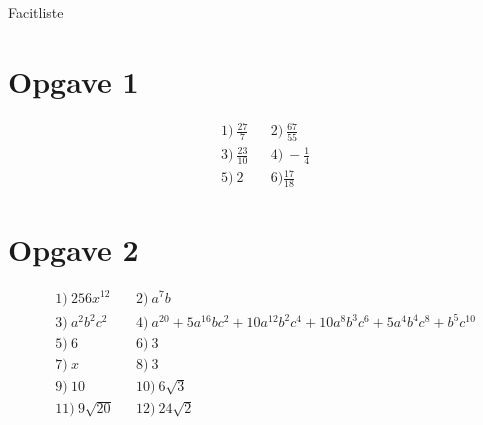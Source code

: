 \begin{center}
\Huge
Facitliste
\end{center}
\section*{Opgave 1}
\begin{align*}
&1) \ \frac{27}{7}  &&2)\ \frac{67}{55} \\
&3) \ \frac{23}{10}  &&4)\ -\frac{1}{4} \\
&5) \ 2  &&6) \frac{17}{18}\ 
\end{align*}
\section*{Opgave 2}
\begin{align*}
&1) \ 256x^{12}  &&2) \ a^7b \\
&3) \ a^2b^2c^2 &&4)  \ a^{20} + 5 a^{16} b c^2 + 10 a^{12} b^2 c^4 + 10 a^8 b^3 c^6 + 5 a^4 b^4 c^8 + b^5 c^{10} \\
&5) \ 6  &&6) \ 3 \\
&7) \ x  &&8) \ 3 \\
&9) \ 10 &&10) \ 6\sqrt{3} \\
&11) \ 9\sqrt{20} &&12) \ 24\sqrt{2} \\
\end{align*}
